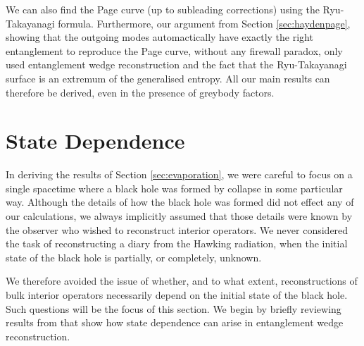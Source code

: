 \documentclass[11pt,a4paper]{article}
\begin{document}
We can also find the Page curve (up to subleading corrections) using the Ryu-Takayanagi formula. Furthermore, our argument from Section \ref{sec:haydenpage}, showing that the outgoing modes automactically have exactly the right entanglement to reproduce the Page curve, without any firewall paradox, only used entanglement wedge reconstruction and the fact that the Ryu-Takayanagi surface is an extremum of the generalised entropy. All our main results can therefore be derived, even in the presence of greybody factors. 

\section{State Dependence} \label{sec:statedependence}
In deriving the results of Section \ref{sec:evaporation}, we were careful to focus on a single spacetime where a black hole was formed by collapse in some particular way. Although the details of how the black hole was formed did not effect any of our calculations, we always implicitly assumed that those details were known by the observer who wished to reconstruct interior operators. We never considered the task of reconstructing a diary from the Hawking radiation, when the initial state of the black hole is partially, or completely, unknown. 

We therefore avoided the issue of whether, and to what extent, reconstructions of bulk interior operators necessarily depend on the initial state of the black hole. Such questions will be the focus of this section. We begin by briefly reviewing results from \cite{hayden2018learning} that show how state dependence can arise in entanglement wedge reconstruction.
\end{document}
